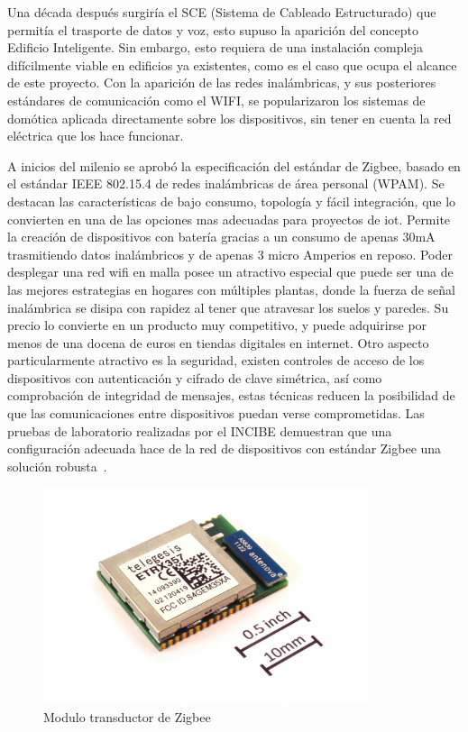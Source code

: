 \vspace{1cm}

Una década después surgiría el SCE (Sistema de Cableado Estructurado) que permitía el trasporte de datos y voz, esto supuso la aparición del concepto Edificio Inteligente. Sin embargo, esto requiera de una instalación compleja difícilmente viable en edificios ya existentes, como es el caso que ocupa el alcance de este proyecto. Con la aparición de las redes inalámbricas, y sus posteriores estándares de comunicación como el WIFI, se popularizaron los sistemas de domótica aplicada directamente sobre los dispositivos, sin tener en cuenta la red eléctrica que los hace funcionar. 

\vspace{1cm}

 A inicios del milenio se aprobó la especificación del estándar de Zigbee, basado en el estándar IEEE 802.15.4 de redes inalámbricas de área personal (WPAM). Se destacan las características de bajo consumo, topología y fácil integración, que lo convierten en una de las opciones mas adecuadas para proyectos de \gls{iot}. Permite la creación de dispositivos con batería gracias a un consumo de apenas 30mA  trasmitiendo datos inalámbricos y de apenas 3 micro Amperios en reposo. Poder desplegar una red \gls{wifi} en malla posee un atractivo especial que puede ser una de las mejores estrategias en hogares con múltiples plantas, donde la fuerza de señal inalámbrica se disipa con rapidez al tener que atravesar los suelos y paredes. Su precio lo convierte en un producto muy competitivo, y puede adquirirse por menos de una docena de euros en tiendas digitales en internet. Otro aspecto particularmente atractivo es la seguridad, existen controles de acceso de los dispositivos con autenticación y cifrado de clave simétrica, así como comprobación de integridad de mensajes, estas técnicas reducen la posibilidad de que las comunicaciones entre dispositivos puedan verse comprometidas. Las pruebas de laboratorio realizadas por el INCIBE demuestran que una configuración adecuada hace de la red de dispositivos con estándar Zigbee una solución robusta~\cite{incibe_zigbee}.
 
\begin{figure}[hbt!]
\centering
\includegraphics[height=2.5in]{figures/ETRX357_ZigBee_module_with_size_ref.jpg}
\caption[Modulo transductor de 2.4Gh Zigbee ETRX357]{Modulo transductor de Zigbee\footnotemark}
\end{figure}



